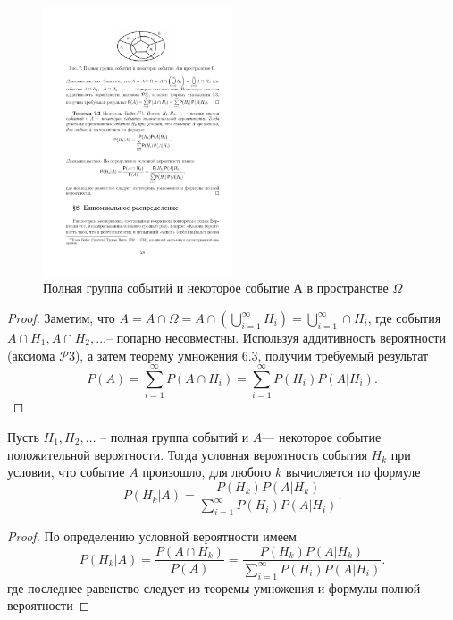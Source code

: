 \begin{figure}[H]
	\centering
	\includegraphics[width=0.5\textwidth]{pic/pic7.pdf}
	\caption{Полная группа событий и некоторое событие А в пространстве $\Omega$}
	\label{pic:7}
\end{figure}


\begin{proof}
	Заметим, что $A=A\cap\Omega=A\cap\left(\bigcup\limits^{\infty}_{i=1}H_i\right)=\bigcup\limits_{i=1}^{\infty}\cap H_i$, где события $A\cap H_1,A\cap H_2,\dots$-- попарно несовместны. Используя аддитивность вероятности (аксиома $\mathcal{P}3$), а затем теорему умножения 6.3, получим требуемый результат
	\begin{equation*}
		P(A)=\sum\limits_{i=1}^{\infty}P(A\cap H_i)=
		\sum\limits_{i=1}^{\infty}P(H_i)P(A|H_i).
	\end{equation*}
\end{proof}

\begin{theorem}
Пусть $H_1,H_2,\dots$ – полная группа
событий и $A $— некоторое событие положительной вероятности. Тогда
условная вероятность события $H_k$ при условии, что событие $A$ произошло,
для любого $k$ вычисляется по формуле
\begin{equation*}
	P(H_k|A)=\frac{P(H_k)P(A|H_k)}{\sum\limits_{i=1}^{\infty}P(H_i)P(A|H_i)}.
\end{equation*}
\end{theorem}

\begin{proof}
	По определению условной вероятности имеем
	\begin{equation*}
		P(H_k|A)=\frac{P(A\cap H_k)}{P(A)}=\frac{P(H_k)P(A|H_k)}
		{\sum\limits_{i=1}^{\infty}P(H_i)P(A|H_i)}.
	\end{equation*}
где последнее равенство следует из теоремы умножения и формулы полной
вероятности
\end{proof}